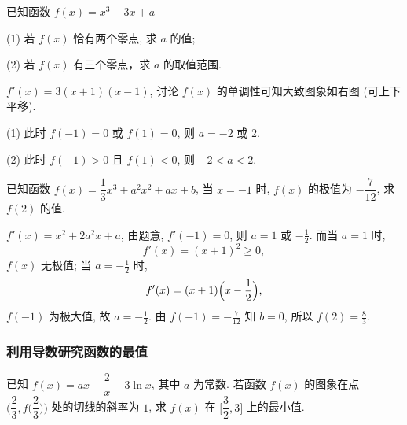   \begin{example}
    已知函数 $f(x)=x^3 -3x+a$ 
    
    (1) 若 $f(x)$ 恰有两个零点, 求 $a$ 的值;
    
    (2) 若 $f(x)$ 有三个零点，求 $a$ 的取值范围.
  \end{example}

  \beginsolution
    $f'(x)=3(x+1)(x-1)$, 
    讨论 $f(x)$ 的单调性可知大致图象如右图 (可上下平移).
    
    (1) 此时 $f(-1)=0$ 或 $f(1)=0$, 则 $a=-2$ 或 $2$.
    
    (2) 此时 $f(-1)>0$ 且 $f(1)<0$, 则 $-2<a<2$.
  \endsolution
  
  \lianxi
  \begin{exercise}[s]
    已知函数 $f(x)=\dfrac13 x^3 +a^2 x^2 +ax+b$, 当 $x=-1$ 时, 
    $f(x)$ 的极值为 $-\dfrac7{12}$, 求 $f(2)$ 的值.
  \end{exercise}

  \beginsolution
    $f'(x)=x^2+2a^2x+a$, 由题意, $f'(-1)=0$, 
    则 $a=1$ 或 $-\frac12$. 而当 $a=1$ 时, 
    \[f'(x)=(x+1)^2\geqslant 0,\]
    $f(x)$ 无极值; 当 $a=-\frac12$ 时, 
    \[f'(x)=(x+1)\Bigl(x-\frac12\Bigr),\]
    $f(-1)$ 为极大值, 故 $a=-\frac12$. 由 $f(-1)=-\frac7{12}$ 知 $b=0$, 所以 $f(2)=\frac83$.
  \endsolution
  
  \subsubsection{利用导数研究函数的最值}
  \begin{example}
    已知 $f(x)=ax- \dfrac2x -3\ln x$, 其中 $a$ 为常数.
    若函数 $f(x)$ 的图象在点 $\Big(\dfrac23, f\Big(\dfrac23\Big)\Big)$ 
    处的切线的斜率为 $1$, 求 $f(x)$ 在 $\Big[\dfrac32,3\Big]$ 上的最小值.
  \end{example}

